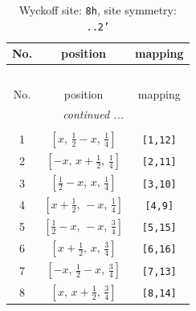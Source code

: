 \documentclass[fleqn,8pt]{jsarticle}
\begin{document}
\begin{longtable}{ccc}
\caption{Wyckoff site: {\tt 8h}, site symmetry: {\tt ..2'}}
 \\
 \hline \hline
No. & position & mapping \\ \hline \endfirsthead

\multicolumn{2}{l}{\tablename\ \thetable{}} \\
 \hline \hline
No. & position & mapping \\ \hline \endhead

 \hline \hline
\multicolumn{2}{r}{\footnotesize\it continued ...} \\ \endfoot

 \hline \hline
\multicolumn{2}{r}{} \\ \endlastfoot

1 & $\left[ x,\, \frac{1}{2} - x,\, \frac{1}{4} \right]$ & {\tt [1,12]} \\ \hline
2 & $\left[ - x,\, x + \frac{1}{2},\, \frac{1}{4} \right]$ & {\tt [2,11]} \\ \hline
3 & $\left[ \frac{1}{2} - x,\, x,\, \frac{1}{4} \right]$ & {\tt [3,10]} \\ \hline
4 & $\left[ x + \frac{1}{2},\, - x,\, \frac{1}{4} \right]$ & {\tt [4,9]} \\ \hline
5 & $\left[ \frac{1}{2} - x,\, - x,\, \frac{3}{4} \right]$ & {\tt [5,15]} \\ \hline
6 & $\left[ x + \frac{1}{2},\, x,\, \frac{3}{4} \right]$ & {\tt [6,16]} \\ \hline
7 & $\left[ - x,\, \frac{1}{2} - x,\, \frac{3}{4} \right]$ & {\tt [7,13]} \\ \hline
8 & $\left[ x,\, x + \frac{1}{2},\, \frac{3}{4} \right]$ & {\tt [8,14]} \\
\end{longtable}
\renewcommand{\arraystretch}{1.2}
\end{document}
